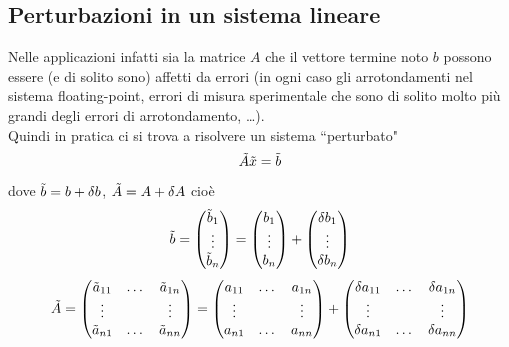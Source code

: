 \documentclass[12pt,a4paper]{article}
\begin{document}
\subsection{Perturbazioni in un sistema lineare}
Nelle applicazioni infatti sia la matrice $A$ che il vettore termine noto $b$ possono essere (e di solito sono) affetti da errori (in ogni caso gli arrotondamenti nel sistema floating-point, errori di misura sperimentale che sono di solito molto più grandi degli errori di arrotondamento, \dots).\\
Quindi in pratica ci si trova a risolvere un sistema ``perturbato"
\begin{equation*}
    \Tilde{A}\Tilde{x}=\Tilde{b}
\end{equation*}
dove $\Tilde{b}=b+\delta b$, $\Tilde{A}=A+\delta A$ cioè
\begin{equation*}
    \Tilde{b}= 
    \begin{pmatrix}
    \Tilde{b}_1\\  
    \vdots\\ 
    \Tilde{b}_n
\end{pmatrix} =
\begin{pmatrix}
    b_1\\  
    \vdots\\ 
    b_n
\end{pmatrix} + 
\begin{pmatrix}
    \delta b_1\\  
    \vdots\\ 
    \delta b_n
\end{pmatrix}
\end{equation*}
\begin{equation*}
    \Tilde{A} =
    \begin{pmatrix}
        \Tilde{a}_{11} & \dots & \Tilde{a}_{1n} \\
        \vdots & & \vdots \\
        \Tilde{a}_{n1} & \dots & \Tilde{a}_{nn}
    \end{pmatrix} = 
    \begin{pmatrix}
        a_{11} & \dots & a_{1n} \\
        \vdots & & \vdots  \\
        a_{n1} & \dots & a_{nn}
    \end{pmatrix} +
    \begin{pmatrix}
        \delta a_{11} & \dots & \delta a_{1n} \\
        \vdots & & \vdots \\
        \delta a_{n1} & \dots & \delta a_{nn}
    \end{pmatrix}
\end{equation*}
\end{document}

